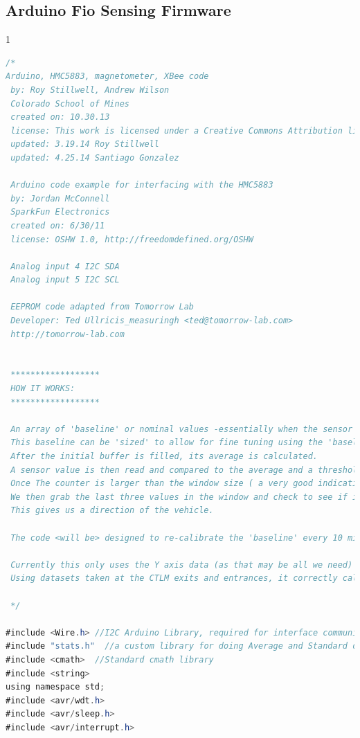\documentclass[11pt, oneside, fullpage, doublespace]{article}
\begin{document}
\subsection*{Arduino Fio Sensing Firmware}
\begin{spacing}{1}
\begin{lstlisting}[language=java]
/*
Arduino, HMC5883, magnetometer, XBee code 
 by: Roy Stillwell, Andrew Wilson
 Colorado School of Mines
 created on: 10.30.13
 license: This work is licensed under a Creative Commons Attribution license.
 updated: 3.19.14 Roy Stillwell
 updated: 4.25.14 Santiago Gonzalez
 
 Arduino code example for interfacing with the HMC5883 
 by: Jordan McConnell
 SparkFun Electronics
 created on: 6/30/11
 license: OSHW 1.0, http://freedomdefined.org/OSHW
 
 Analog input 4 I2C SDA
 Analog input 5 I2C SCL
 
 EEPROM code adapted from Tomorrow Lab
 Developer: Ted Ullricis_measuringh <ted@tomorrow-lab.com>
 http://tomorrow-lab.com
 
 
 ******************
 HOW IT WORKS:
 ******************
 
 An array of 'baseline' or nominal values -essentially when the sensor does NOT have a vehicle over it- is gathered initially. 
 This baseline can be 'sized' to allow for fine tuning using the 'baselineSize' variable in the 'Variables you can change' section.
 After the initial buffer is filled, its average is calculated. 
 A sensor value is then read and compared to the average and a threshold.  If it is outside this threshold, a counter is started.  
 Once The counter is larger than the window size ( a very good indication of a car), we have detected a vehicle! 
 We then grab the last three values in the window and check to see if it is greater or smaller than the baseline average.  
 This gives us a direction of the vehicle.  
 
 The code <will be> designed to re-calibrate the 'baseline' every 10 minutes (basically in the event a sensor is hit wiht a solar storm or something).
 
 Currently this only uses the Y axis data (as that may be all we need)
 Using datasets taken at the CTLM exits and entrances, it correctly calculates entrances and exits.
 
 */

#include <Wire.h> //I2C Arduino Library, required for interface communication with HMC5883 Device
#include "stats.h"  //a custom library for doing Average and Standard deviation calculations.
#include <cmath>  //Standard cmath library
#include <string>
using namespace std;
#include <avr/wdt.h>
#include <avr/sleep.h>
#include <avr/interrupt.h>




\end{lstlisting}
\end{spacing}
\end{document}
